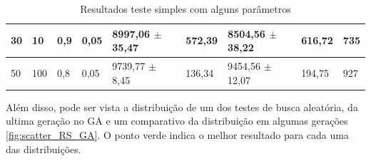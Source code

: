 \begin{table}[h]
\begin{tabular}{|l|l|l|l|l|l|l|l|l|}
		30    & 10     & 0,9	& 0,05    & 8997,06 $\pm$ 35,47     & 572,39    & 8504,56 $\pm$ 38,22       & 616,72        & 735                                                            \\ \hline
		50    & 100    & 0,8	& 0,05    & 9739,77 $\pm$ 8,45      & 136,34    & 9454,56 $\pm$ 12,07       & 194,75       & 927                                                            \\ \hline
	\end{tabular}
	\caption{Resultados teste simples com alguns parâmetros}
	\label{tab:resultados_teste1}
\end{table}

Além disso, pode ser vista a distribuição de um dos testes de busca aleatória, da ultima geração no GA e um comparativo da distribuição em algumas gerações \autoref{fig:scatter_RS_GA}. O ponto verde indica o melhor resultado para cada uma das distribuições. 

